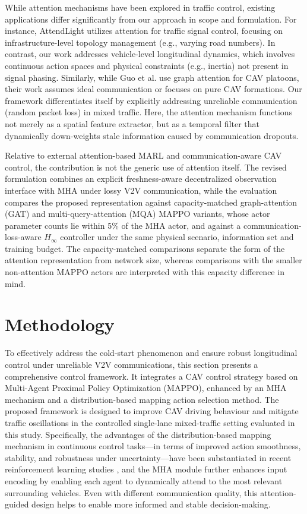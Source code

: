 \documentclass{ieeeaccess}
\begin{document}
 While attention mechanisms have been explored in traffic control, existing applications differ significantly from our approach in scope and formulation. For instance, AttendLight \cite{Oroojlooy2020_AttendLight} utilizes attention for traffic signal control, focusing on infrastructure-level topology management (e.g., varying road numbers). In contrast, our work addresses vehicle-level longitudinal dynamics, which involves continuous action spaces and physical constraints (e.g., inertia) not present in signal phasing. Similarly, while Guo et al. use graph attention for CAV platoons, their work assumes ideal communication or focuses on pure CAV formations\cite{guo2024attention}. Our framework differentiates itself by explicitly addressing unreliable communication (random packet loss) in mixed traffic. Here, the attention mechanism functions not merely as a spatial feature extractor, but as a temporal filter that dynamically down-weights stale information caused by communication dropouts.

Relative to external attention-based MARL and communication-aware CAV control, the contribution is not the generic use of attention itself. The revised formulation combines an explicit freshness-aware decentralized observation interface with MHA under lossy V2V communication, while the evaluation compares the proposed representation against capacity-matched graph-attention (GAT) and multi-query-attention (MQA) MAPPO variants, whose actor parameter counts lie within 5\% of the MHA actor, and against a communication-loss-aware $H_\infty$ controller under the same physical scenario, information set and training budget. The capacity-matched comparisons separate the form of the attention representation from network size, whereas comparisons with the smaller non-attention MAPPO actors are interpreted with this capacity difference in mind.

\section{Methodology}
\label{sec:Methodology}
To effectively address the cold-start phenomenon and ensure robust longitudinal control under unreliable V2V communications, this section presents a comprehensive control framework.
It integrates a CAV control strategy based on Multi-Agent Proximal Policy Optimization (MAPPO), enhanced by an MHA mechanism and a distribution-based mapping action selection method. The proposed framework is designed to improve CAV driving behaviour and mitigate traffic oscillations in the controlled single-lane mixed-traffic setting evaluated in this study. Specifically, the advantages of the distribution-based mapping mechanism in continuous control tasks---in terms of improved action smoothness, stability, and robustness under uncertainty---have been substantiated in recent reinforcement learning studies \cite{shi2022deep}, and the MHA module further enhances input encoding by enabling each agent to dynamically attend to the most relevant surrounding vehicles. Even with different communication quality, this attention-guided design helps to enable more informed and stable decision-making.
\end{document}
